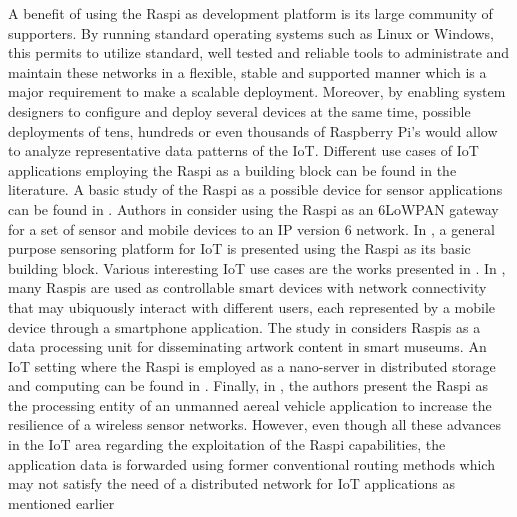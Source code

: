 A benefit of using the \ac{Raspi} as development platform is its large
community of supporters. By running standard operating systems such as
Linux or Windows, this permits to utilize standard, well tested and
reliable tools to administrate and maintain these networks in
a flexible, stable and supported manner which is a major requirement
to make a scalable deployment. Moreover, by enabling system designers to
configure and deploy several devices at the same time, possible deployments
of tens, hundreds or even thousands of Raspberry Pi's would allow to
analyze representative data patterns of the \ac{IoT}. Different use cases of
\ac{IoT} applications employing the \ac{Raspi} as a building block can be found
in the literature. A basic study of the \ac{Raspi} as a possible device
for sensor applications can be found in \cite{vujovic2014raspberry}.
Authors in \cite{kruger2015rapid} consider using the \ac{Raspi} as an
\ac{6LoWPAN} gateway for a set of sensor and mobile devices to an
\ac{IP} version 6 network. In \cite{mahmoud2016sensorian}, a general
purpose sensoring platform for \ac{IoT} is presented using the \ac{Raspi}
as its basic building block. Various interesting \ac{IoT} use cases
are the works presented in \cite{wirz2015enabling,alletto2016indoor,
jalali2016fog,ueyama2014exploiting}. In \cite{wirz2015enabling}, many
\ac{Raspi}s are used as controllable smart devices
with network connectivity that may ubiquously interact with different users,
each represented by a mobile device through a smartphone application.
The study in \cite{alletto2016indoor} considers \ac{Raspi}s as a data
processing unit for disseminating artwork content in smart museums.
An \ac{IoT} setting where the \ac{Raspi} is employed as a nano-server
in distributed storage and computing can be found in \cite{jalali2016fog}.
Finally, in \cite{ueyama2014exploiting}, the authors present
the \ac{Raspi} as the processing entity of an unmanned aereal
vehicle application to increase the resilience of a wireless sensor networks.
However, even though all these advances in the \ac{IoT} area regarding
the exploitation of the \ac{Raspi} capabilities, the application data
is forwarded using former conventional routing methods which may
not satisfy the need of a distributed network for \ac{IoT}
applications as mentioned earlier 

